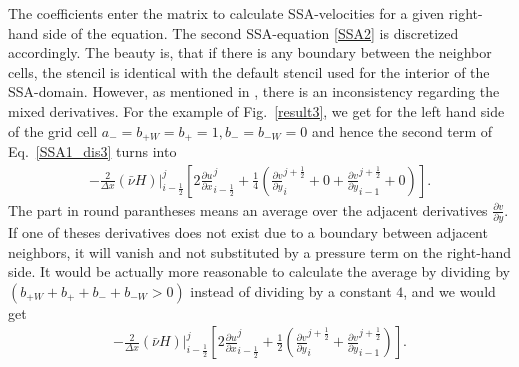 \documentclass[a4paper,10pt]{article}
\begin{document}
The coefficients enter the matrix to calculate SSA-velocities for a given right-hand side of the equation. The second SSA-equation \eqref{SSA2} is discretized accordingly.
The beauty is, that if there is any boundary between the neighbor cells, the stencil is identical with the default stencil used for the interior of the SSA-domain.\newline
However, as mentioned in \cite{Winkelmann_Martin10}, there is an inconsistency regarding the mixed derivatives. For the example of Fig.~\ref{result3}, we get for the left hand side of the grid cell $a_-=b_{+W}=b_+=1, b_-=b_{-W}=0$ and hence the second term of Eq.~\eqref{SSA1_dis3} turns into
\begin{align}
-\frac{2}{\Delta x}(\bar{\nu}H)|_{i-\frac{1}{2}}^j\left[2\frac{\partial u}{\partial x}_{i-\frac{1}{2}}^j + \frac{1}{4}\left( \frac{\partial v}{\partial y}_{i}^{j+\frac{1}{2}} + 0 + \frac{\partial v}{\partial y}_{i-1}^{j+\frac{1}{2}} + 0 \right) \right].
\label{SSA1_dis3b}
\end{align}
The part in round parantheses means an average over the adjacent derivatives $\frac{\partial v}{\partial y}$. If one of theses derivatives does not exist due to a boundary between adjacent neighbors, it will vanish and not substituted by a pressure term on the right-hand side. It would be actually more reasonable to calculate the average by dividing by $(b_{+W}+b_++b_-+b_{-W}>0)$ instead of dividing by a constant $4$, and we would get
\begin{align}
-\frac{2}{\Delta x}(\bar{\nu}H)|_{i-\frac{1}{2}}^j\left[2\frac{\partial u}{\partial x}_{i-\frac{1}{2}}^j + \frac{1}{2}\left( \frac{\partial v}{\partial y}_{i}^{j+\frac{1}{2}} + \frac{\partial v}{\partial y}_{i-1}^{j+\frac{1}{2}}\right) \right].
\label{SSA1_dis3c}
\end{align}

\end{document}
